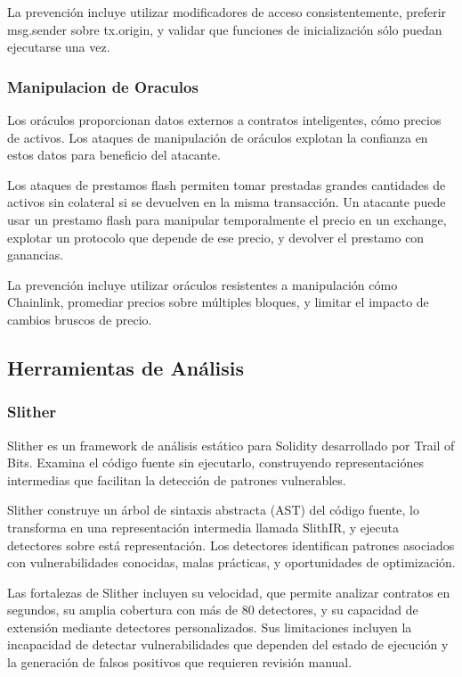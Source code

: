 \documentclass[12pt,a4paper,twoside]{book}
\begin{document}
La prevención incluye utilizar modificadores de acceso consistentemente, preferir msg.sender sobre tx.origin, y validar que funciones de inicialización sólo puedan ejecutarse una vez.

\subsubsection{Manipulacion de Oraculos}

Los oráculos proporcionan datos externos a contratos inteligentes, cómo precios de activos. Los ataques de manipulación de oráculos explotan la confianza en estos datos para beneficio del atacante.

Los ataques de prestamos flash permiten tomar prestadas grandes cantidades de activos sin colateral si se devuelven en la misma transacción. Un atacante puede usar un prestamo flash para manipular temporalmente el precio en un exchange, explotar un protocolo que depende de ese precio, y devolver el prestamo con ganancias.

La prevención incluye utilizar oráculos resistentes a manipulación cómo Chainlink, promediar precios sobre múltiples bloques, y limitar el impacto de cambios bruscos de precio.

\subsection{Herramientas de Análisis}

\subsubsection{Slither}

Slither es un framework de análisis estático para Solidity desarrollado por Trail of Bits. Examina el código fuente sin ejecutarlo, construyendo representaciónes intermedias que facilitan la detección de patrones vulnerables.

Slither construye un árbol de sintaxis abstracta (AST) del código fuente, lo transforma en una representación intermedia llamada SlithIR, y ejecuta detectores sobre está representación. Los detectores identifican patrones asociados con vulnerabilidades conocidas, malas prácticas, y oportunidades de optimización.

Las fortalezas de Slither incluyen su velocidad, que permite analizar contratos en segundos, su amplia cobertura con más de 80 detectores, y su capacidad de extensión mediante detectores personalizados. Sus limitaciones incluyen la incapacidad de detectar vulnerabilidades que dependen del estado de ejecución y la generación de falsos positivos que requieren revisión manual.
\end{document}
